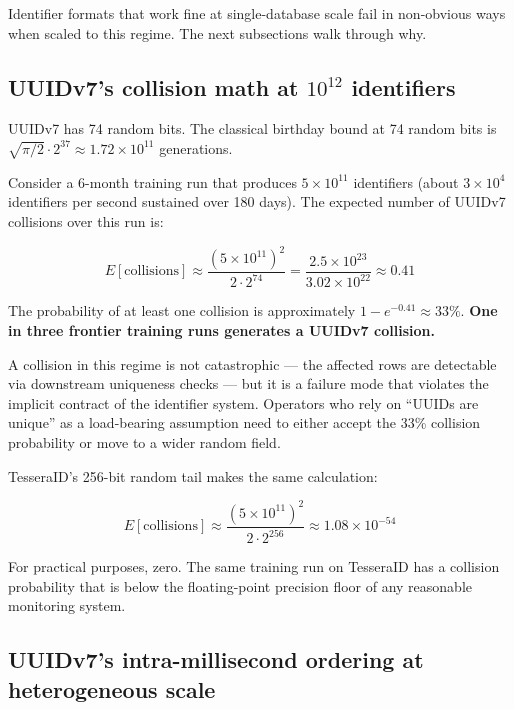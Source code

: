 Identifier formats that work fine at single-database scale fail in non-obvious ways when scaled to this regime. The next subsections walk through why.

\subsection{UUIDv7's collision math at $10^{12}$ identifiers}

UUIDv7 has 74 random bits. The classical birthday bound at 74 random bits is $\sqrt{\pi/2} \cdot 2^{37} \approx 1.72 \times 10^{11}$ generations.

Consider a 6-month training run that produces $5 \times 10^{11}$ identifiers (about $3 \times 10^4$ identifiers per second sustained over 180 days). The expected number of UUIDv7 collisions over this run is:

\begin{equation}
E[\text{collisions}] \approx \frac{(5 \times 10^{11})^2}{2 \cdot 2^{74}} = \frac{2.5 \times 10^{23}}{3.02 \times 10^{22}} \approx 0.41
\end{equation}

The probability of at least one collision is approximately $1 - e^{-0.41} \approx 33\%$. \textbf{One in three frontier training runs generates a UUIDv7 collision.}

A collision in this regime is not catastrophic --- the affected rows are detectable via downstream uniqueness checks --- but it is a failure mode that violates the implicit contract of the identifier system. Operators who rely on ``UUIDs are unique'' as a load-bearing assumption need to either accept the 33\% collision probability or move to a wider random field.

TesseraID's 256-bit random tail makes the same calculation:

\begin{equation}
E[\text{collisions}] \approx \frac{(5 \times 10^{11})^2}{2 \cdot 2^{256}} \approx 1.08 \times 10^{-54}
\end{equation}

For practical purposes, zero. The same training run on TesseraID has a collision probability that is below the floating-point precision floor of any reasonable monitoring system.

\subsection{UUIDv7's intra-millisecond ordering at heterogeneous scale}

